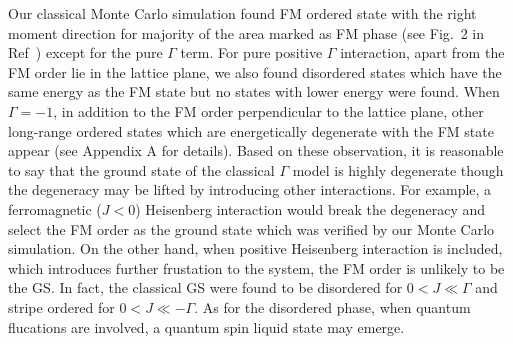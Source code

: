 \documentclass[aps,prb,reprint,amsfonts,amsmath,amssymb,showpacs,groupedaddress,superscriptaddress]{revtex4-1}
\begin{document}
Our classical Monte Carlo simulation found FM ordered state with the right moment direction for majority of the area marked as FM phase (see Fig.~2 in Ref~) except for the pure $\Gamma$ term. For pure positive $\Gamma$ interaction, apart from the FM order lie in the lattice plane, we also found disordered states which have the same energy as the FM state but no states with lower energy were found. When $\Gamma=-1$, in addition to the FM order perpendicular to the lattice plane, other long-range ordered states which are energetically degenerate with the FM state appear (see Appendix A for details). Based on these observation, it is reasonable to say that the ground state of the classical $\Gamma$ model is highly degenerate though the degeneracy may be lifted by introducing other interactions. For example, a ferromagnetic ($J<0$) Heisenberg interaction would break the degeneracy and select the FM order as the ground state which was verified by our Monte Carlo simulation. On the other hand, when positive Heisenberg interaction is included, which introduces further frustation to the system, the FM order is unlikely to be the GS. In fact, the classical GS were found to be disordered for $0 < J \ll \Gamma$ and stripe ordered for $0 < J \ll -\Gamma$. As for the disordered phase, when quantum flucations are involved, a quantum spin liquid state may emerge.
\end{document}
